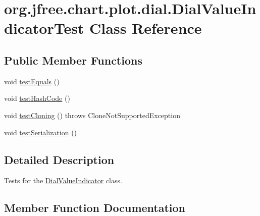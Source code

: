 \hypertarget{classorg_1_1jfree_1_1chart_1_1plot_1_1dial_1_1_dial_value_indicator_test}{}\section{org.\+jfree.\+chart.\+plot.\+dial.\+Dial\+Value\+Indicator\+Test Class Reference}
\label{classorg_1_1jfree_1_1chart_1_1plot_1_1dial_1_1_dial_value_indicator_test}
\subsection*{Public Member Functions}
\begin{DoxyCompactItemize}
\item 
void \mbox{\hyperlink{classorg_1_1jfree_1_1chart_1_1plot_1_1dial_1_1_dial_value_indicator_test_aeaafaf676b78194b35091f22aaf5741e}{test\+Equals}} ()
\item 
void \mbox{\hyperlink{classorg_1_1jfree_1_1chart_1_1plot_1_1dial_1_1_dial_value_indicator_test_acc896844f6f308cb603215fe9e49606e}{test\+Hash\+Code}} ()
\item 
void \mbox{\hyperlink{classorg_1_1jfree_1_1chart_1_1plot_1_1dial_1_1_dial_value_indicator_test_aab0dca145f146702483f4f48e50b0f74}{test\+Cloning}} ()  throws Clone\+Not\+Supported\+Exception 
\item 
void \mbox{\hyperlink{classorg_1_1jfree_1_1chart_1_1plot_1_1dial_1_1_dial_value_indicator_test_a9f2fd60e6e820f14c11163cd1bda4efa}{test\+Serialization}} ()
\end{DoxyCompactItemize}


\subsection{Detailed Description}
Tests for the \mbox{\hyperlink{classorg_1_1jfree_1_1chart_1_1plot_1_1dial_1_1_dial_value_indicator}{Dial\+Value\+Indicator}} class. 

\subsection{Member Function Documentation}
\mbox{\label{classorg_1_1jfree_1_1chart_1_1plot_1_1dial_1_1_dial_value_indicator_test_aab0dca145f146702483f4f48e50b0f74}} 
